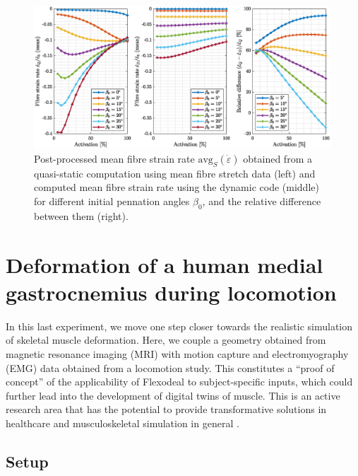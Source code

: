 \documentclass{sfuthesis}
\numberwithin{equation}{section}
\numberwithin{figure}{chapter}
\numberwithin{table}{chapter}
\theoremstyle{definition}
\newcommand{\depsilon}{\dot{\varepsilon}}
\begin{document}
\begin{figure}
    \centering
    \includegraphics[width=0.99\textwidth]{ic-mean-fibre-strain-rate.eps}
    \caption{Post-processed mean fibre strain rate $\mathrm{avg}_S(\depsilon)$ obtained from a quasi-static computation using mean fibre stretch data (left) and computed mean fibre strain rate using the dynamic code (middle) for different initial pennation angles $\beta_0$, and the relative difference between them (right).
    \label{fig:ic-mean-fibre-strain-rate-slab}}
\end{figure}


\section{Deformation of a human medial gastrocnemius during locomotion} \label{sec:flexodeal_mri}

In this last experiment, we move one step closer towards the realistic simulation of skeletal muscle deformation. Here, we couple a geometry obtained from magnetic resonance imaging (MRI) with motion capture and electromyography (EMG) data obtained from a locomotion study. This constitutes a ``proof of concept'' of the applicability of Flexodeal to subject-specific inputs, which could further lead into the development of digital twins of muscle. This is an active research area that has the potential to provide transformative solutions in healthcare and musculoskeletal simulation in general \cite{Diniz2025DigitalTwin}.

\subsection{Setup}
\end{document}
